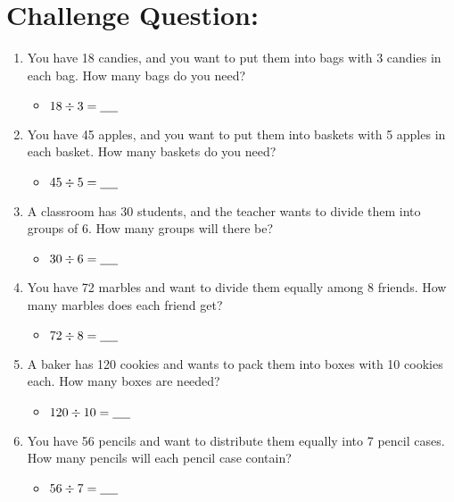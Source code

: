 \section{Challenge Question:}
\begin{enumerate}[label=(\alph*)]
    \item You have 18 candies, and you want to put them into bags with 3 candies in each bag. How many bags do you need?
    \begin{itemize}
        \item $18 \div 3 = \underline{\hspace{0.5cm}}$
    \end{itemize}
    \item You have 45 apples, and you want to put them into baskets with 5 apples in each basket. How many baskets do you need?
    \begin{itemize}
        \item $45 \div 5 = \underline{\hspace{0.5cm}}$
    \end{itemize}
    \item A classroom has 30 students, and the teacher wants to divide them into groups of 6. How many groups will there be?
    \begin{itemize}
        \item $30 \div 6 = \underline{\hspace{0.5cm}}$
    \end{itemize}
    \item You have 72 marbles and want to divide them equally among 8 friends. How many marbles does each friend get?
    \begin{itemize}
        \item $72 \div 8 = \underline{\hspace{0.5cm}}$
    \end{itemize}
    \item A baker has 120 cookies and wants to pack them into boxes with 10 cookies each. How many boxes are needed?
    \begin{itemize}
        \item $120 \div 10 = \underline{\hspace{0.5cm}}$
    \end{itemize}
    \item You have 56 pencils and want to distribute them equally into 7 pencil cases. How many pencils will each pencil case contain?
    \begin{itemize}
        \item $56 \div 7 = \underline{\hspace{0.5cm}}$

\end{itemize}
\end{enumerate}

